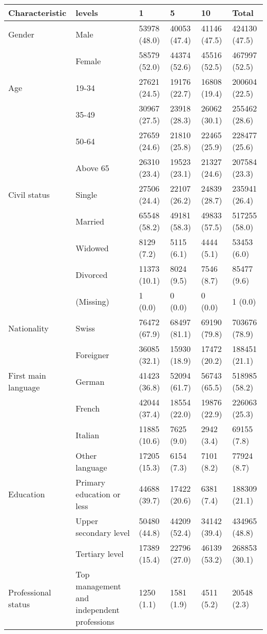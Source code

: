 
\begin{tabular}{llllll}
\toprule
Characteristic & levels & 1 & 5 & 10 & Total\\
\midrule
Gender & Male & 53978 (48.0) & 40053 (47.4) & 41146 (47.5) & 424130 (47.5)\\
 & Female & 58579 (52.0) & 44374 (52.6) & 45516 (52.5) & 467997 (52.5)\\
\addlinespace
Age & 19-34 & 27621 (24.5) & 19176 (22.7) & 16808 (19.4) & 200604 (22.5)\\
 & 35-49 & 30967 (27.5) & 23918 (28.3) & 26062 (30.1) & 255462 (28.6)\\
 & 50-64 & 27659 (24.6) & 21810 (25.8) & 22465 (25.9) & 228477 (25.6)\\
 & Above 65 & 26310 (23.4) & 19523 (23.1) & 21327 (24.6) & 207584 (23.3)\\
\addlinespace
Civil status & Single & 27506 (24.4) & 22107 (26.2) & 24839 (28.7) & 235941 (26.4)\\
 & Married & 65548 (58.2) & 49181 (58.3) & 49833 (57.5) & 517255 (58.0)\\
 & Widowed & 8129 (7.2) & 5115 (6.1) & 4444 (5.1) & 53453 (6.0)\\
 & Divorced & 11373 (10.1) & 8024 (9.5) & 7546 (8.7) & 85477 (9.6)\\
 & (Missing) & 1 (0.0) & 0 (0.0) & 0 (0.0) & 1 (0.0)\\
\addlinespace
Nationality & Swiss & 76472 (67.9) & 68497 (81.1) & 69190 (79.8) & 703676 (78.9)\\
 & Foreigner & 36085 (32.1) & 15930 (18.9) & 17472 (20.2) & 188451 (21.1)\\
\addlinespace
First main language & German & 41423 (36.8) & 52094 (61.7) & 56743 (65.5) & 518985 (58.2)\\
 & French & 42044 (37.4) & 18554 (22.0) & 19876 (22.9) & 226063 (25.3)\\
 & Italian & 11885 (10.6) & 7625 (9.0) & 2942 (3.4) & 69155 (7.8)\\
 & Other language & 17205 (15.3) & 6154 (7.3) & 7101 (8.2) & 77924 (8.7)\\
\addlinespace
Education & Primary education or less & 44688 (39.7) & 17422 (20.6) & 6381 (7.4) & 188309 (21.1)\\
 & Upper secondary level & 50480 (44.8) & 44209 (52.4) & 34142 (39.4) & 434965 (48.8)\\
 & Tertiary level & 17389 (15.4) & 22796 (27.0) & 46139 (53.2) & 268853 (30.1)\\
\addlinespace
Professional status & Top management and independent professions & 1250 (1.1) & 1581 (1.9) & 4511 (5.2) & 20548 (2.3)\\

\end{tabular}
